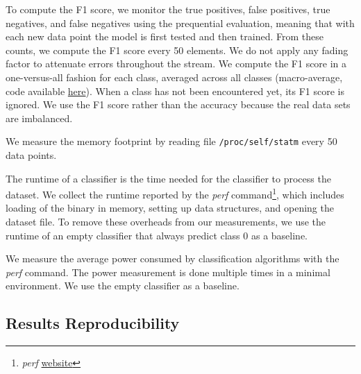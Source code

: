 To compute the F1 score, we monitor the true positives, false positives, true
negatives, and false negatives using the prequential evaluation, meaning that
with each new data point the model is first tested and then trained.  From these
counts, we compute the F1 score every 50 elements. We do not apply any fading
factor to attenuate errors throughout the stream.  We compute the F1 score in a
one-versus-all fashion for each class, averaged across all classes
(macro-average, code available
\href{https://github.com/big-data-lab-team/benchmark-har-data-stream/blob/f314bf4a258e96e418e249228897d269c59cd522/src/main.cpp\#L81}{here}).
When a class has not been encountered yet, its F1 score is ignored. We use the
F1 score rather than the accuracy because the real data sets are imbalanced.

We measure the memory footprint by reading file
\texttt{/proc/self/statm} every 50 data points.

The runtime of a classifier is the time needed for
the classifier to process the dataset. We
collect the runtime reported by the \textit{perf}
command\footnote{\textit{perf}
\href{https://perf.wiki.kernel.org/index.php/Main_Page}{website}}, which
includes loading of the binary in memory, setting up data structures, and
opening the dataset file. To remove these overheads from our measurements,
we use the runtime of an empty classifier that always predict class 0 as a baseline.

We measure the average power consumed by classification
algorithms with the \textit{perf} command. The power measurement is done
multiple times in a minimal environment. We use the empty classifier as a
baseline.

\subsection{Results Reproducibility}

